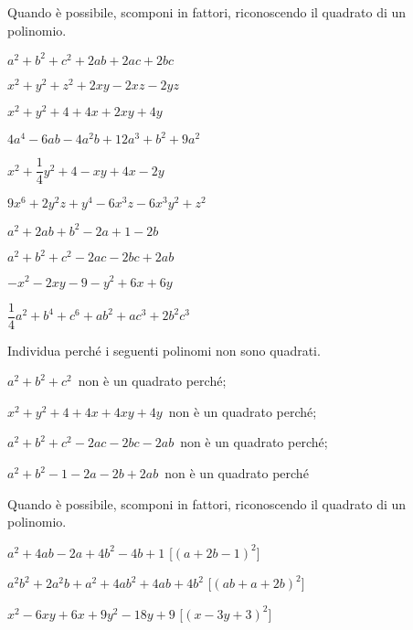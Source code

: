 \begin{esercizio}
\label{ese:16.13}
Quando è possibile, scomponi in fattori, riconoscendo il quadrato di un 
polinomio.
\begin{multicols}{2}
\begin{enumeratea}
 \item $a^{2}+b^{2}+c^{2}+2ab+2ac+2bc$
 \item $x^{2}+y^{2}+z^{2}+2xy-2xz-2yz$
 \item $x^{2}+y^{2}+4+4x+2xy+4y$
 \item $4a^{4}-6{ab}-4a^{2}b+12a^{3}+b^{2}+9a^{2}$
 \item $x^{2}+\dfrac{1}{4}y^{2}+4-xy+4x-2y$
 \item $9x^{6}+2y^{2}z+y^{4}-6x^{3}z-6x^{3}y^{2}+z^{2}$
 \item $a^{2}+2ab+b^{2}-2a+1-2b$
 \item $a^{2}+b^{2}+c^{2}-2ac-2bc+2ab$
 \item $-x^{2}-2xy-9-y^{2}+6x+6y$
 \item $\dfrac{1}{4}a^{2}+b^{4}+c^{6}+ab^{2}+{ac}^{3}+2b^{2}c^{3}$
\end{enumeratea}
\end{multicols}
\end{esercizio}

\begin{esercizio}
Individua perché i seguenti polinomi non sono quadrati.
\label{ese:16.16}
\begin{enumeratea}
 \item $a^{2}+b^{2}+c^{2}$\, non è un quadrato perché\dotfill;
 \item $x^{2}+y^{2}+4+4x+4xy+4y$\, non è un quadrato perché\dotfill;
 \item $a^{2}+b^{2}+c^{2}-2ac-2bc-2ab$\, non è un quadrato perché\dotfill;
 \item $a^{2}+b^{2}-1-2a-2b+2ab$\, non è un quadrato perché\dotfill
\end{enumeratea}
\end{esercizio}

\begin{esercizio}[\Ast]
\label{ese:16.17}
Quando è possibile, scomponi in fattori, riconoscendo il quadrato di un polinomio.
\begin{enumeratea}
 \item $a^{2}+4ab-2a+4b^{2}-4b+1$
  \hfill [$(a+2b-1)^{2}$]
 \item $a^{2}b^{2}+2a^{2}b+a^{2}+4ab^{2}+4ab+4b^{2}$
  \hfill [$(ab+a+2b)^{2}$]
 \item $x^{2}-6xy+6x+9y^{2}-18y+9$
  \hfill [$(x-3y+3)^{2}$]
\end{enumeratea}
\end{esercizio}


